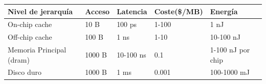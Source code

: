 \begin{table}[H]
	\centering
	\begin{tabularx}{0.9\textwidth}{|p{3.5cm}|X|X|p{3cm}|X|}
		\hline
		\textbf{Nivel de jerarquía}    & \textbf{Acceso} & \textbf{Latencia} & \textbf{Coste(\$/MB)} & \textbf{Energía}  \\
		\hline
		On-chip cache                  & 10 B            & 100 ps            & 1-100                 & 1 nJ              \\
		\hline
		Off-chip cache                 & 100 B           & 1 ns              & 1-10                  & 10-100 nJ         \\
		\hline
		Memoria Principal (\gls{dram}) & 1000 B          & 10-100 ns         & 0.1                   & 1-100 nJ por chip \\
		\hline
		Disco duro                     & 1000 B          & 1 ms              & 0.001                 & 100-1000 mJ       \\
		\hline
	\end{tabularx}
\end{table}
